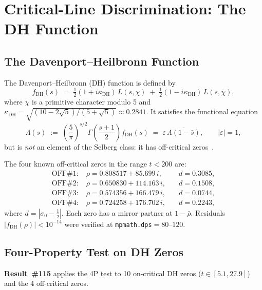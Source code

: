 \documentclass[11pt, a4paper]{article}
\theoremstyle{plain}
\theoremstyle{definition}
\newcommand{\DHf}{\mathrm{DH}}         %
\begin{document}
\section{Critical-Line Discrimination: The DH Function}
\label{sec:dh}

\subsection{The Davenport--Heilbronn Function}
\label{ssec:dhdef}

The Davenport--Heilbronn (DH) function is defined by
\[
  f_{\DHf}(s) \;=\; \tfrac{1}{2}(1+i\kappa_{\DHf})\,L(s,\chi)
              \;+\; \tfrac{1}{2}(1-i\kappa_{\DHf})\,L(s,\bar{\chi}),
\]
where $\chi$ is a primitive character modulo 5 and
$\kappa_{\DHf} = \sqrt{(10-2\sqrt{5})/(5+\sqrt{5})} \approx 0.2841$.
It satisfies the functional equation
\[
  \Lambda(s) \;:=\; \left(\frac{5}{\pi}\right)^{s/2}\Gamma\!\left(\frac{s+1}{2}\right)f_{\DHf}(s)
  \;=\; \varepsilon\,\overline{\Lambda(1-\bar{s})},
  \qquad |\varepsilon|=1,
\]
but is \emph{not} an element of the Selberg class: it has off-critical
zeros~\cite{titchmarsh1986}.

The four known off-critical zeros in the range $t<200$ are:
\begin{equation}
  \label{eq:dhzeros}
  \begin{aligned}
    \text{OFF\#1}: &\;\rho=0.808517+85.699\,i, &\quad d=0.3085,\\
    \text{OFF\#2}: &\;\rho=0.650830+114.163\,i, &\quad d=0.1508,\\
    \text{OFF\#3}: &\;\rho=0.574356+166.479\,i, &\quad d=0.0744,\\
    \text{OFF\#4}: &\;\rho=0.724258+176.702\,i, &\quad d=0.2243,
  \end{aligned}
\end{equation}
where $d=|\sigma_{0}-\tfrac{1}{2}|$.  Each zero has a mirror partner
at $1-\bar{\rho}$.  Residuals $|f_{\DHf}(\rho)|<10^{-14}$ were
verified at \texttt{mpmath.dps}$=80$--$120$.


\subsection{Four-Property Test on DH Zeros}
\label{ssec:dhtest}

\textbf{Result~\#115} applies the 4P test to 10 on-critical DH zeros
($t\in[5.1, 27.9]$) and the 4 off-critical zeros.
\end{document}
